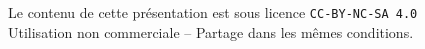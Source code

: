 \documentclass[xcolor={table,usenames,dvipsnames}]{article}
\begin{document}
\begin{enumerate}
\end{enumerate}


\hrulefill

		\printbibliography
		
		
	\centering
{\small Le contenu de cette présentation est sous licence \texttt{CC-BY-NC-SA 4.0}\\Utilisation non commerciale -- Partage dans les mêmes conditions.\\}
\href{https://creativecommons.org/licenses/by-nc-sa/4.0/deed.fr}{\ccbyncsa}
	
\end{document}
